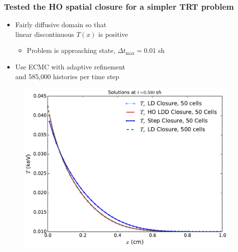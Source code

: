 \documentclass[xcolor=dvipsnames,hyperref={pdfpagelabels=false},unknownkeysallowed]{beamer}
\newlength{\wideitemsep}
\let\olditem\item
\renewcommand{\item}{\setlength{\itemsep}{\wideitemsep}\olditem}
\begin{document}
\begin{frame}
    \frametitle{Tested the HO spatial closure  for a simpler TRT problem}
    \begin{itemize}
        \item[] Fairly diffusive domain so that \\ linear discontinuous $T(x)$ is positive
            \begin{itemize}
                \item Problem is approaching state, $\Delta t_{\max} = 0.01$ sh
            \end{itemize}
        \item[] Use ECMC with adaptive refinement \\ and 585,000 histories per time step
    \end{itemize}
\begin{figure}[H]
    \centering
    \includegraphics[width=0.65\linewidth]{smooth_compare.pdf}
\end{figure}
\end{frame}
\end{document}
